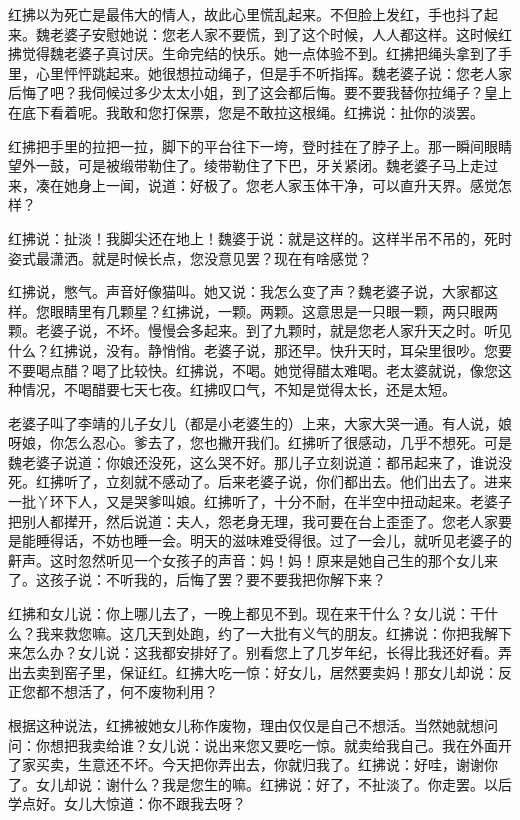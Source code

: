 红拂以为死亡是最伟大的情人，故此心里慌乱起来。不但脸上发红，手也抖了起来。魏老婆子安慰她说：您老人家不要慌，到了这个时候，人人都这样。这时候红拂觉得魏老婆子真讨厌。生命完结的快乐。她一点体验不到。红拂把绳头拿到了手里，心里怦怦跳起来。她很想拉动绳子，但是手不听指挥。魏老婆子说：您老人家后悔了吧？我伺候过多少太太小姐，到了这会都后悔。要不要我替你拉绳子？皇上在底下看着呢。我敢和您打保票，您是不敢拉这根绳。红拂说：扯你的淡罢。 

红拂把手里的拉把一拉，脚下的平台往下一垮，登时挂在了脖子上。那一瞬间眼睛望外一鼓，可是被缎带勒住了。绫带勒住了下巴，牙关紧闭。魏老婆子马上走过来，凑在她身上一闻，说道：好极了。您老人家玉体干净，可以直升天界。感觉怎样？ 

红拂说：扯淡！我脚尖还在地上！魏婆于说：就是这样的。这样半吊不吊的，死时姿式最潇洒。就是时候长点，您没意见罢？现在有啥感觉？ 

红拂说，憋气。声音好像猫叫。她又说：我怎么变了声？魏老婆子说，大家都这样。您眼睛里有几颗星？红拂说，一颗。两颗。这意思是一只眼一颗，两只眼两颗。老婆子说，不坏。慢慢会多起来。到了九颗时，就是您老人家升天之时。听见什么？红拂说，没有。静悄悄。老婆子说，那还早。快升天时，耳朵里很吵。您要不要喝点醋？喝了比较快。红拂说，不喝。她觉得醋太难喝。老太婆就说，像您这种情况，不喝醋要七天七夜。红拂叹口气，不知是觉得太长，还是太短。 

老婆子叫了李靖的儿子女儿（都是小老婆生的）上来，大家大哭一通。有人说，娘呀娘，你怎么忍心。爹去了，您也撇开我们。红拂听了很感动，几乎不想死。可是魏老婆子说道：你娘还没死，这么哭不好。那儿子立刻说道：都吊起来了，谁说没死。红拂听了，立刻就不感动了。后来老婆子说，你们都出去。他们出去了。进来一批丫环下人，又是哭爹叫娘。红拂听了，十分不耐，在半空中扭动起来。老婆子把别人都撵开，然后说道：夫人，怨老身无理，我可要在台上歪歪了。您老人家要是能睡得话，不妨也睡一会。明天的滋味难受得很。过了一会儿，就听见老婆子的鼾声。这时忽然听见一个女孩子的声音：妈！妈！原来是她自己生的那个女儿来了。这孩子说：不听我的，后悔了罢？要不要我把你解下来？ 

红拂和女儿说：你上哪儿去了，一晚上都见不到。现在来干什么？女儿说：干什么？我来救您嘛。这几天到处跑，约了一大批有义气的朋友。红拂说：你把我解下来怎么办？女儿说：这我都安排好了。别看您上了几岁年纪，长得比我还好看。弄出去卖到窑子里，保证红。红拂大吃一惊：好女儿，居然要卖妈！那女儿却说：反正您都不想活了，何不废物利用？ 

根据这种说法，红拂被她女儿称作废物，理由仅仅是自己不想活。当然她就想问问：你想把我卖给谁？女儿说：说出来您又要吃一惊。就卖给我自己。我在外面开了家买卖，生意还不坏。今天把你弄出去，你就归我了。红拂说：好哇，谢谢你了。女儿却说：谢什么？我是您生的嘛。红拂说：好了，不扯淡了。你走罢。以后学点好。女儿大惊道：你不跟我去呀？ 

